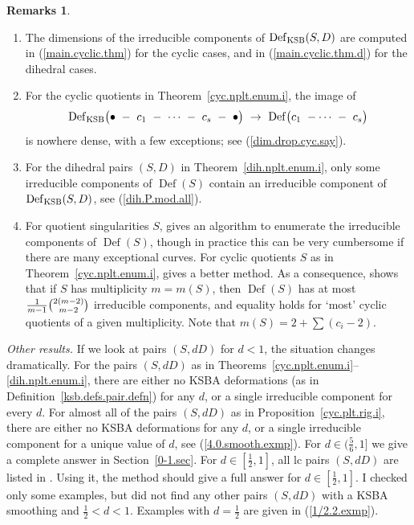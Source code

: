 \documentclass{amsart}
\theoremstyle{definition}
\newtheorem{rems}[thm]{Remarks}
\theoremstyle{remark}
\newcommand{\defsp}[0]{\operatorname{Def}}
\begin{document}
  
\begin{rems}{\ }
\begin{enumerate}
\item  The dimensions of the irreducible components of $\defsp_{\rm KSB}(S, D)$ are computed in (\ref{main.cyclic.thm}) for the cyclic cases, and in (\ref{main.cyclic.thm.d}) for the dihedral  cases.
\item  For the cyclic quotients  in Theorem~\ref{cyc.nplt.enum.i},
  the image of
  $$
  \defsp_{\rm KSB}\bigl(\bullet \ - \ c_1 \ - \ \cdots  \ - \  c_s  \ - \ \bullet\bigr)\ \to\ \defsp\bigl(c_1  \ - \cdots  \ - \  c_s\bigr)
  $$
  is nowhere dense, with a few exceptions; see (\ref{dim.drop.cyc.say}).
\item For the dihedral pairs $(S, D)$ in Theorem~\ref{dih.nplt.enum.i},
  only some irreducible components of $\defsp(S)$ contain an
  irreducible component of $\defsp_{\rm KSB}(S, D)$, see (\ref{dih.P.mod.all}). 
  \item For quotient singularities $S$, \cite[3.14]{ksb} gives an algorithm to
enumerate the irreducible components of $\defsp(S)$, though in practice this can be very cumbersome if there are many exceptional curves. For cyclic quotients $S$ as in Theorem~\ref{cyc.nplt.enum.i}, \cite{MR1129040} gives a  better method.  As a consequence, \cite{MR1129040} shows that if $S$ has  multiplicity $m=m(S)$, then $\defsp(S)$ has at most  $\tfrac1{m-1}\tbinom{2(m-2)}{m-2}$
  irreducible components, and equality holds for `most' cyclic quotients of a given multiplicity. Note that $m(S)=2+\sum (c_i-2)$. 
    \end{enumerate}
\end{rems}

{\it Other results.} 
If we  look at pairs $(S, dD)$ for  $d<1$, the situation changes dramatically. For the pairs $(S, dD)$ as in Theorems~\ref{cyc.nplt.enum.i}--\ref{dih.nplt.enum.i}, there are either no  KSBA deformations (as in Definition~\ref{ksb.defs.pair.defn}) for any $d$, or a single
irreducible component for every $d$.
For almost all of the pairs $(S, dD)$ as in Proposition~\ref{cyc.plt.rig.i}, there are 
 either no  KSBA deformations for any $d$, or a single
 irreducible component for a unique value of  $d$, see (\ref{4.0.smooth.exmp}). For $d\in (\frac56,1]$ we give a complete answer   in Section~\ref{0-1.sec}.
 For $d\in [\frac12,1]$, all lc pairs $(S, dD)$ are listed   in \cite[Sec.3.3]{kk-singbook}. Using it, 
  the method should give a full answer for  $d\in [\frac12,1]$. I checked  only  some examples, but  did not find any other pairs $(S, dD)$ with a KSBA smoothing and  $\frac12< d<1$.  Examples with $d=\frac12$ are given in (\ref{1/2.2.exmp}).
\end{document}

